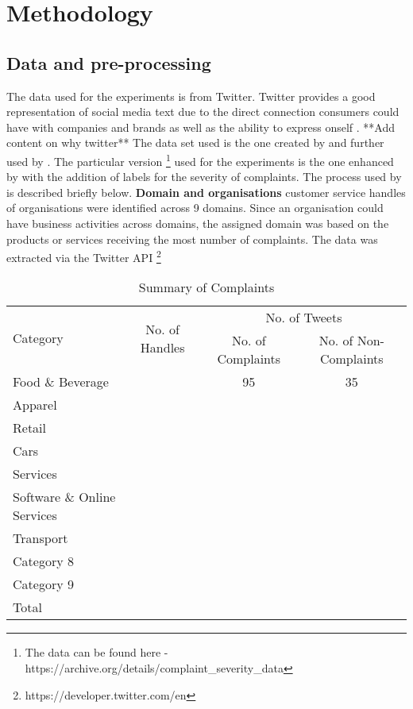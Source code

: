 \chapter{Methodology}

\section{Data and pre-processing}
The data used for the experiments is from Twitter. Twitter provides a good representation of social media text due to the direct connection consumers could have with companies and brands as well as the ability to express onself \cite{preotiuc-pietro_automatically_2019}. **Add content on why twitter**
\newline \newline
The data set used is the one created by \cite{preotiuc-pietro_automatically_2019} and further used by \cite{jin_complaint_2020}. The particular version \footnote{The data can be found here - https://archive.org/details/complaint\_severity\_data} used for the experiments is the one enhanced by \cite{jinModelingSeverityComplaints2021} with the addition of labels for the severity of complaints. The process used by \cite{preotiuc-pietro_automatically_2019} is described briefly below. 
\newline \newline
\textbf{Domain and organisations}  customer service handles of organisations were identified across 9 domains. Since an organisation could have business activities across domains, the assigned domain was based on the products or services receiving the most number of complaints. The data was extracted via the Twitter API \footnote{https://developer.twitter.com/en} 

\begin{table}[ht]
    \centering
    \begin{tabular}{|l|c|c|c|}
    \hline
    \multirow{2}{*}{Category} & \multirow{2}{*}{No. of Handles} & \multicolumn{2}{c|}{No. of Tweets} \\
    \cline{3-4}
    & & No. of Complaints & No. of Non-Complaints \\
    \hline
    Food \& Beverage & & 95 & 35\\
    Apparel & & & \\
    Retail & & & \\
    Cars & & & \\
    Services & & & \\
    Software \& Online Services & & & \\
    Transport & & & \\
    Category 8 & & & \\
    Category 9 & & & \\
    \hline
    Total & & & \\
    \hline
    \end{tabular}
    \caption{Summary of Complaints}    
    \end{table}    

